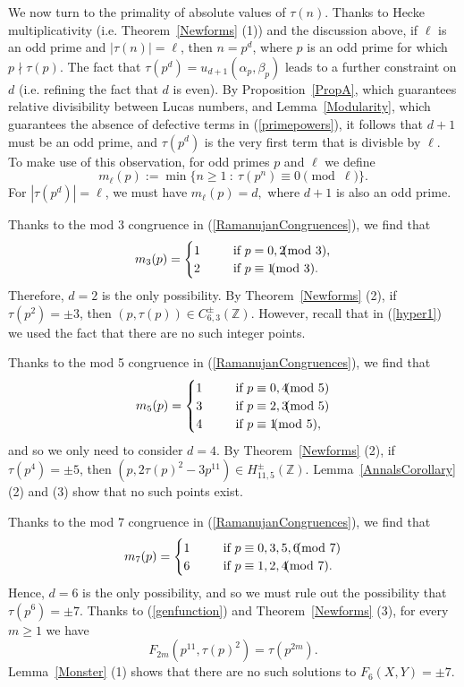 \documentclass[12pt]{amsart}
\newcommand{\Z}{\mathbb{Z}}
\numberwithin{equation}{section}
\begin{document}
We now turn to the primality of absolute values of $\tau(n)$.
Thanks to Hecke multiplicativity (i.e. Theorem~\ref{Newforms} (1)) and the discussion above,  if $\ell$ is an odd prime and $|\tau(n)|=\ell$, then $n=p^d$, where $p$ is an odd prime for which
 $p\nmid \tau(p).$ The fact that $\tau(p^d)=u_{d+1}(\alpha_p,\beta_p)$ leads to a further constraint on $d$ 
(i.e. refining 
 the fact that $d$ is even).
By Proposition~\ref{PropA}, which guarantees relative divisibility between Lucas numbers, and 
 Lemma~\ref{Modularity}, which guarantees the absence of defective terms in (\ref{primepowers}), it follows that 
$d+1$ must be an odd prime, and $\tau(p^d)$ is the very first term that is divisble by $\ell$.
To make use of this observation, for odd primes 
$p$ and $\ell$ we define
\begin{equation}
m_{\ell}(p):=\min\{ n\geq 1\ : \ \tau(p^n)\equiv 0\!\!\!\!\pmod{\ell}\}.
\end{equation}
For $|\tau(p^d)|=\ell$, we must have $m_{\ell}(p)=d,$ where $d+1$ is also an odd prime.

Thanks to the mod 3 congruence in (\ref{RamanujanCongruences}), we find that
$$
m_3(p)=\begin{cases} 1 \ \ \ \ \ &{\text {\rm if }} p=0, 2\!\!\!\!\pmod 3,\\
2\ \ \ \ \ &{\text {\rm if }} p\equiv 1\!\!\!\!\pmod 3.
\end{cases}
$$
Therefore, $d=2$ is the only possibility.
By Theorem~\ref{Newforms} (2), if $\tau(p^2)=\pm 3$, then
 $(p,\tau(p))\in C^{\pm}_{6,3}(\Z)$.
 However, recall that in (\ref{hyper1}) we used the fact that there are no such integer points.
 
Thanks to the mod 5 congruence in (\ref{RamanujanCongruences}), we find that
$$
m_5(p)=\begin{cases} 1 \ \ \ \ \ &{\text {\rm if }} p\equiv 0, 4\!\!\!\!\pmod{5}\\
3 \ \ \ \ \ &{\text {\rm if }} p\equiv 2, 3\!\!\!\!\pmod{5}\\
4 \ \ \ \ \ &{\text {\rm if }} p\equiv 1\!\!\!\!\pmod{5},
\end{cases}
$$
and so we only need to consider $d=4.$
By Theorem~\ref{Newforms} (2), if $\tau(p^4)=\pm 5$, then
 $(p, 2\tau(p)^2-3p^{11})\in H^{\pm}_{11,5}(\Z)$.
Lemma~\ref{AnnalsCorollary} (2) and (3) show that no such points exist.

Thanks to the mod 7 congruence in (\ref{RamanujanCongruences}), we find that
$$
m_7(p)=\begin{cases}
1 \ \ \ \ \ &{\text {\rm if }} p\equiv 0, 3, 5, 6\!\!\!\!\pmod{7}\\
6 \ \ \ \ \ &{\text {\rm if }} p\equiv 1, 2, 4\!\!\!\!\pmod{7}.
\end{cases}
$$
Hence, $d=6$ is the only possibility, and so we must rule out the possibility that $\tau(p^6)=\pm 7$.
Thanks to (\ref{genfunction}) and Theorem~\ref{Newforms} (3), 
for every $m\geq 1$ we have
$$
F_{2m}(p^{11},\tau(p)^2)=\tau(p^{2m}).
$$
Lemma~\ref{Monster} (1) shows that there are no such solutions to $F_6(X,Y)=\pm 7.$
\end{document}
